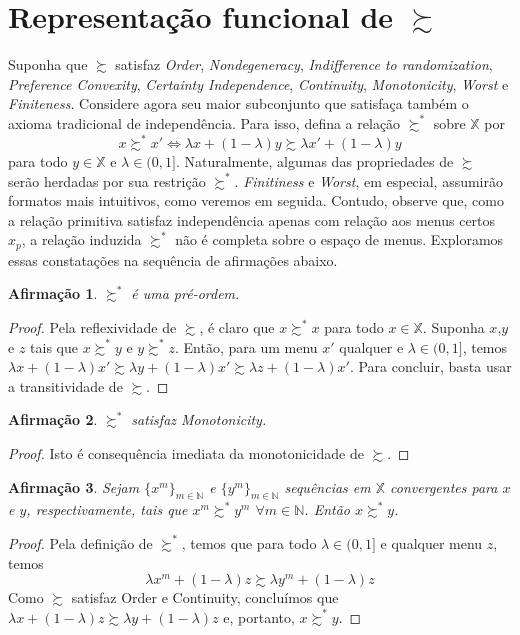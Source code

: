 \documentclass[11pt, a4paper]{article}
\theoremstyle{nonumberplain}
\newtheorem{proof}{Dem.}
\theoremstyle{plain}
\theoremstyle{plain}
\newtheorem{claim}{Afirmação}
\theoremstyle{plain}
\theoremstyle{nonumberplain}
\begin{document}
\section{Representação funcional de $\succsim$}
Suponha que $\succsim$ satisfaz \textit{Order}, \textit{Nondegeneracy}, \textit{Indifference to randomization}, \textit{Preference Convexity}, \textit{Certainty Independence}, \textit{Continuity}, \textit{Monotonicity}, \textit{Worst} e \textit{Finiteness}. Considere agora seu maior subconjunto que satisfaça também o axioma tradicional de independência. Para isso, defina a relação $\succsim^*$ sobre $\mathbb{X}$ por $$x\succsim^* x' \Leftrightarrow \lambda x + (1-\lambda)y \succsim \lambda x' + (1-\lambda)y$$ para todo $y\in \mathbb{X}$ e $\lambda\in(0,1]$.
Naturalmente, algumas das propriedades de $\succsim$ serão herdadas por sua restrição $\succsim^*$. \textit{Finitiness} e \textit{Worst}, em especial, assumirão formatos mais intuitivos, como veremos em seguida. Contudo, observe que, como a relação primitiva satisfaz independência apenas com relação aos menus certos $x_p$, a relação induzida $\succsim^*$ não é completa sobre o espaço de menus. Exploramos essas constatações na sequência de afirmações abaixo.
\begin{claim}$\succsim^*$ é uma pré-ordem. \end{claim}
\begin{proof} Pela reflexividade de $\succsim$, é claro que $x\succsim^* x$ para todo $x\in \mathbb{X}$. Suponha $x$,$y$ e $z$ tais que $x\succsim^* y$ e $y\succsim^* z$. Então, para um menu $x'$ qualquer e $\lambda\in(0,1]$, temos $\lambda x + (1-\lambda)x'\succsim \lambda y + (1-\lambda)x'\succsim \lambda z + (1-\lambda)x'$. Para concluir, basta usar a transitividade de $\succsim$.
\end{proof}
\begin{claim}\label{monotonicidade}$\succsim^*$ satisfaz Monotonicity. \end{claim}
\begin{proof}
Isto é consequência imediata da monotonicidade de $\succsim$.
\end{proof}
\begin{claim}\label{continuidade} Sejam $\{x^m\}_{m\in\mathbb{N}}$ e $\{y^m\}_{m\in\mathbb{N}}$ sequências em $\mathbb{X}$ convergentes para $x$ e $y$, respectivamente, tais que $x^m\succsim^* y^m$ $\forall m\in \mathbb{N}$. Então $x\succsim^* y$.\end{claim}
\begin{proof}
Pela definição de $\succsim^*$, temos que para todo $\lambda\in (0,1]$ e qualquer menu $z$, temos $$\lambda x^m + (1-\lambda)z \succsim \lambda y^m + (1-\lambda)z$$ Como $\succsim$ satisfaz Order e Continuity, concluímos que $\lambda x + (1-\lambda)z \succsim \lambda y + (1-\lambda)z$ e, portanto, $x\succsim^* y$.
\end{proof}
\end{document}
